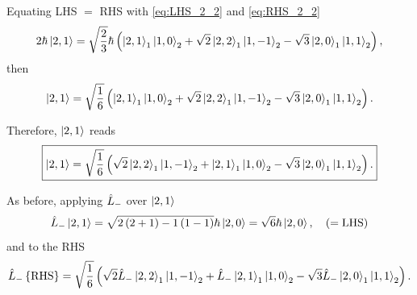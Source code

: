 Equating LHS $=$ RHS with \cref{eq:LHS_2_2} and \cref{eq:RHS_2_2} 
\begin{equation}
    2 \hbar \Ket{2,1} =
    \sqrt{\frac{2}{3}} \hbar \left(
        \Ket{2,1}_1 \Ket{1,0}_2 + \sqrt{2} \Ket{2,2}_1 \Ket{1,-1}_2
        - \sqrt{3} \Ket{2,0}_1 \Ket{1,1}_2
    \right),
\end{equation}
then
\begin{equation}
    \Ket{2,1} =
    \sqrt{\frac{1}{6}} \left(
        \Ket{2,1}_1 \Ket{1,0}_2 + \sqrt{2} \Ket{2,2}_1 \Ket{1,-1}_2
        - \sqrt{3} \Ket{2,0}_1 \Ket{1,1}_2
    \right).
\end{equation}

Therefore, $\Ket{2,1}$ reads
\begin{equation}
    \boxed{
        \Ket{2,1} =
        \sqrt{\frac{1}{6}} \left(
            \sqrt{2} \Ket{2,2}_1 \Ket{1,-1}_2
            + \Ket{2,1}_1 \Ket{1,0}_2
            - \sqrt{3} \Ket{2,0}_1 \Ket{1,1}_2
        \right).
    }
\end{equation}

As before, applying $\hat{L}_{-}$ over $\Ket{2,1}$ 
\begin{equation}\label{eq:LHS_2_1}
    \hat{L}_{-} \Ket{2,1} =
    \sqrt{2\left( 2 + 1 \right) - 1\left( 1 - 1 \right)} \hbar \Ket{2,0} = 
    \sqrt{6} \hbar \Ket{2,0},
    \quad \left( =\text{LHS} \right)
\end{equation}
and to the RHS 
\begin{equation}\label{eq:RHS_2_1_aux}
    \hat{L}_{-} \left\{ \text{RHS} \right\} =
        \sqrt{\frac{1}{6}} \left(
            \sqrt{2} \hat{L}_{-} \Ket{2,2}_1 \Ket{1,-1}_2
            + \hat{L}_{-} \Ket{2,1}_1 \Ket{1,0}_2
            - \sqrt{3} \hat{L}_{-} \Ket{2,0}_1 \Ket{1,1}_2
        \right).
\end{equation}

